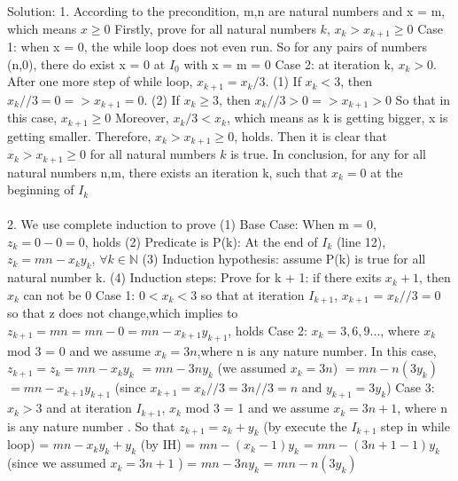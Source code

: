 \documentclass[12pt]{article}
\begin{document}
Solution:\vskip5pt
1. According to the precondition, m,n are natural numbers and x = m, which means $x \ge 0$\vskip5pt
Firstly, prove for all natural numbers $k$, $x_k > x_{k+1}\geq 0$\vskip5pt
Case 1: when x = 0, the while loop does not even run. So for any pairs of numbers (n,0), there do exist x = 0 at $I_0$ with x = m = 0\vskip5pt
Case 2: at iteration k, $x_k > 0$. After one more step of while loop, $x_{k+1} = x_k /3$.\vskip5pt
(1) If $x_{k} < 3$, then $x_k//3 = 0 => x_{k+1} = 0$.\vskip5pt
(2) If $x_{k} \ge 3$, then $x_k//3 > 0 => x_{k+1} > 0$\vskip5pt
So that in this case, $x_{k+1} \ge 0$\vskip5pt
Moreover, $x_k/3 < x_k$, which means as k is getting bigger, x is getting smaller. \vskip5pt
Therefore, $x_k > x_{k+1} \ge 0$, holds.
Then it is clear that $x_k > x_{k+1}\geq 0$ for all natural numbers $k$ is true.\vskip5pt
In conclusion, for any for all natural numbers n,m, there exists an iteration k, such that $x_k =0$ at the beginning of $I_k$ \\[2ex]
\\[2ex]
2. We use complete induction to prove \vskip5pt
(1) Base Case: When m = 0, $z_k = 0 - 0 = 0$, holds \vskip5pt
(2) Predicate is P(k): At the end of $I_k$ (line 12), $z_k = mn-x_ky_k$, $\forall k\in \mathbb{N} $\vskip5pt
(3) Induction hypothesis: assume P(k) is true for all natural number k.\vskip5pt
(4) Induction steps: Prove for k + 1:\vskip5pt
if there exits $x_k+1$, then $x_k$ can not be 0\vskip5pt
Case 1: $ 0 < x_k < 3$ so that at iteration $I_{k+1}$, $x_{k+1}$ = $x_k // 3 = 0$\vskip5pt
so that z does not change,which implies to \vskip5pt
$z_{k+1} = mn = mn - 0 = mn - x_{k+1}y_{k+1}$, holds \vskip5pt
Case 2: $x_k = 3,6,9...$, where $x_k$ mod 3 = 0 and we assume $x_k = 3n$,where n is any nature number.\vskip5pt
In this case,$z_{k+1} = z_k = mn - x_ky_k$\vskip5pt
\qquad \qquad \qquad \qquad $= mn - 3ny_k$ (we assumed $x_k = 3n$)\vskip5pt
\qquad \qquad \qquad \qquad $= mn - n(3y_k)$\vskip5pt
\qquad \qquad \qquad \qquad $= mn - x_{k+1}y_{k+1}$ (since $x_{k+1} = x_k // 3 = 3n // 3 = n$ and  $y_{k+1} = 3y_k$)\vskip5pt
Case 3: $ x_k > 3$ and at iteration $I_{k+1}$, $x_k$ mod 3 = 1 and we assume $x_k = 3n + 1$, where n is any nature number .\vskip5pt
So that $z_{k+1} = z_k + y_k$       (by execute the $I_{k+1}$ step in while loop)\vskip5pt
\qquad \qquad \qquad = $mn - x_ky_k + y_k$ (by IH)\vskip5pt
\qquad \qquad \qquad = $mn - (x_k - 1)y_k$\vskip5pt
\qquad \qquad \qquad = $mn - (3n+1-1)y_k$ (since we assumed $x_k = 3n+1$ )\vskip5pt
\qquad \qquad \qquad = $mn - 3ny_k$\vskip5pt
\qquad \qquad \qquad = $mn - n(3y_k)$ \vskip5pt
\end{document}
